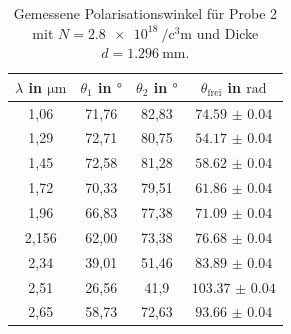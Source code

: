 \begin{table}[H]
    \centering
    \caption{Gemessene Polarisationswinkel für Probe 2 mit $N = \qty{2.8e18}{\per\cubic\centi\meter}$ und Dicke $d = \qty{1.296}{\milli\meter}$.}
    \label{tab:probe2}
    \begin{tabular}{c c c c}
        \toprule
        {$\lambda$ in $\si{\micro\meter}$} & {$\theta_1$ in $\si{\degree}$} & {$\theta_2$ in $\si{\degree}$} & {$\theta_\text{frei}$ in $\si{\radian}$} \\
        \midrule
        1,06 & 71,76 & 82,83 & $\num{74.59(4)}$ \\
        1,29 & 72,71 & 80,75 & $\num{54.17(4)}$ \\
        1,45 & 72,58 & 81,28 & $\num{58.62(4)}$ \\
        1,72 & 70,33 & 79,51 & $\num{61.86(4)}$ \\
        1,96 & 66,83 & 77,38 & $\num{71.09(4)}$ \\
        2,156& 62,00 & 73,38 & $\num{76.68(4)}$ \\
        2,34 & 39,01 & 51,46 & $\num{83.89(4)}$ \\ 
        2,51 & 26,56 & 41,9  & $\num{103.37(4)}$ \\
        2,65 & 58,73 & 72,63 & $\num{93.66(4)}$ \\ 
        \bottomrule
    \end{tabular}
\end{table}

